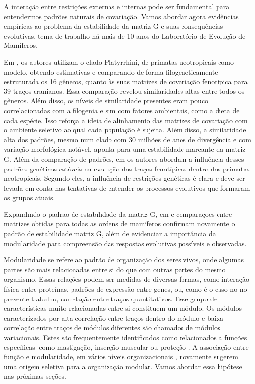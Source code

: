 A interação entre restrições externas e internas pode ser fundamental
para entendermos padrões naturais de covariação. 
Vamos abordar agora evidências empíricas ao problema da estabilidade da
matriz G e suas consequências evolutivas, tema de trabalho há mais de 10
anos do Laboratório de Evolução de Mamíferos. 

Em \cite{Marroig2001}, os autores utilizam o clado Platyrrhini, de
primatas neotropicais como modelo, obtendo estimativas e comparando de
forma filogeneticamente estruturada os 16 gêneros, quanto às suas
matrizes de covariação fenotípica para 39 traços cranianos. 
Essa comparação revelou similaridades altas entre todos os gêneros. 
Além disso, os níveis de similaridade presentes eram pouco
correlacionadas com a filogenia e sim com fatores ambientais, como a
dieta de cada espécie. 
Isso reforça a ideia de alinhamento das matrizes de covariação com o
ambiente seletivo ao qual cada população é sujeita. 
Além disso, a similaridade alta dos padrões, mesmo num clado com 30
milhões de anos de divergência e com variação morfológica notável,
aponta para uma estabilidade marcante da matriz G. 
Além da comparação de padrões, em \cite{Marroig2005, Marroig2010} os
autores abordam a influência desses padrões genéticos estáveis na
evolução dos traços fenotípicos dentro dos primatas neotropicais. 
Segundo eles, a influência de restrições genéticas é clara e deve ser
levada em conta nas tentativas de entender os processos evolutivos que
formaram os grupos atuais. 

Expandindo o padrão de estabilidade da matriz G, em \cite{Porto2008} e
\cite{Marroig2009} comparações entre matrizes obtidas para todas as
ordens de mamíferos confirmam novamente o padrão de estabilidade matriz
G, além de evidenciar a importância da modularidade para compreensão das
respostas evolutivas possíveis e observadas. 

Modularidade se refere ao padrão de organização dos seres vivos, onde
algumas partes são mais relacionadas entre si do que com outras partes
do mesmo organismo. 
Essas relações podem ser medidas de diversas formas, como interação física
entre proteínas, padrões de expressão entre genes, ou, como é o caso no
no presente trabalho, correlação entre traços quantitativos. 
Esse grupo de características muito relacionadas entre si constituem um
módulo. 
Os módulos caracterizados por alta correlação entre traços dentro do
módulo e baixa correlação entre traços de módulos diferentes são
chamados de módulos variacionais. 
Estes são frequentemente identificados como relacionados a funções
específicas, como mastigação, inserção muscular ou proteção
\citep{Cheverud1997}. 
A associação entre função e modularidade, em vários níveis
organizacionais \citep{Costanzo2010}, novamente sugerem uma origem
seletiva para a organização modular. 
Vamos abordar essa hipótese nas próximas seções. 

